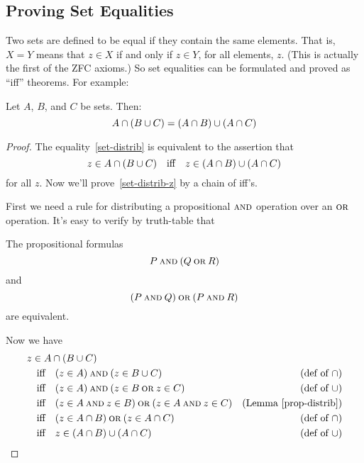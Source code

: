 \subsection{Proving Set Equalities}

Two sets are defined to be equal if they contain the same elements.  That
is, $X = Y$ means that $z \in X$ if and only if $z \in Y$, for all
elements, $z$.  (This is actually the first of the ZFC axioms.)  So set
equalities can be formulated and proved as ``iff'' theorems.  For
example:

\begin{theorem}
Let $A$, $B$, and $C$ be sets.  Then:
\begin{equation}\label{set-distrib}
A \cap (B \cup C) = (A \cap B) \cup (A \cap C)
\end{equation}
\end{theorem}

\begin{proof}
The equality~\eqref{set-distrib} is equivalent to the assertion that
\begin{equation}\label{set-distrib-z}
  z \in A \cap (B \cup C) \quad \text{iff} \quad z \in (A \cap B)
  \cup (A \cap C)
\end{equation}
for all $z$.  Now we'll prove~\eqref{set-distrib-z} by a chain of iff's.

First we need a rule for distributing a propositional $\mathbin{\mathrm{\textsc{and}}}$ operation
over an $\mathbin{\mathrm{\textsc{or}}}$ operation.  It's easy to verify by truth-table that
\begin{lemma}\label{prop-distrib}
The propositional formulas
\[
P \mathbin{\mathrm{\textsc{and}}} (Q \mathbin{\mathrm{\textsc{or}}} R)
\]
and
\[
(P \mathbin{\mathrm{\textsc{and}}} Q) \mathbin{\mathrm{\textsc{or}}} (P \mathbin{\mathrm{\textsc{and}}} R)
\]
are equivalent.
\end{lemma}

Now we have
\begin{align*}
\lefteqn{z \in A \intersect (B \union C)}\\
& \qiff (z \in A) \QAND (z \in B \union C) & \text{(def of $\intersect$)}\\
& \qiff (z \in A) \QAND (z \in B \QOR z \in C)
                & \text{(def of $\union$)}\\
& \qiff (z \in A \QAND z \in B) \QOR (z \in A \QAND z \in C)
                & \text{(Lemma~\ref{prop-distrib})}\\
& \qiff (z \in A \intersect B) \QOR (z \in A \intersect C)
                & \text{(def of $\intersect$)}\\
& \qiff z \in (A \intersect B) \union (A \intersect C)
                & \text{(def of $\union$)}
\end{align*}

\end{proof}
  
